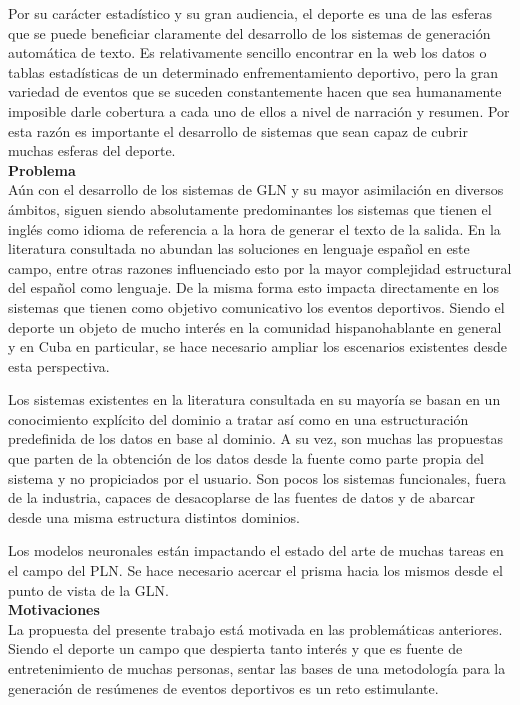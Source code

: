     Por su carácter estadístico y su gran audiencia, el deporte es una de las esferas que se puede beneficiar claramente del desarrollo de los sistemas 
de generación automática de texto. Es relativamente sencillo encontrar en la web los datos o tablas estadísticas de un determinado enfrementamiento deportivo, 
pero la gran variedad de eventos que se suceden constantemente hacen que sea humanamente imposible darle cobertura a cada uno de ellos a nivel de narración y 
resumen. Por esta razón es importante el desarrollo de sistemas que sean capaz de cubrir muchas esferas del deporte.\\


   \textbf{Problema}\\

    Aún con el desarrollo de los sistemas de GLN y su mayor asimilación en diversos ámbitos, siguen siendo absolutamente predominantes los 
sistemas que tienen el inglés como idioma de referencia a la hora de generar el texto de la salida. En la literatura consultada no abundan las soluciones 
en lenguaje español en este campo, entre otras razones influenciado esto por la mayor complejidad estructural del español como lenguaje. De la misma forma esto 
impacta directamente en los sistemas que tienen como objetivo comunicativo los eventos deportivos. Siendo el deporte un objeto de mucho interés en la 
comunidad hispanohablante en general y en Cuba en particular, se hace necesario ampliar los escenarios existentes desde esta perspectiva.

    Los sistemas existentes en la literatura consultada en su mayoría se basan en un conocimiento explícito del dominio a tratar así como en una 
estructuración predefinida de los datos en base al dominio. A su vez, son muchas las propuestas que parten de la obtención de los datos desde 
la fuente como parte propia del sistema y no propiciados por el usuario. Son pocos los sistemas funcionales, fuera de la industria, capaces de 
desacoplarse de las fuentes de datos y de abarcar desde una misma estructura distintos dominios.

    Los modelos neuronales están impactando el estado del arte de muchas tareas en el campo del PLN. Se hace necesario 
acercar el prisma hacia los mismos desde el punto de vista de la GLN.\\

    \textbf{Motivaciones}\\

    La propuesta del presente trabajo está motivada en las problemáticas anteriores. Siendo el deporte un campo que despierta tanto 
interés y que es fuente de entretenimiento de muchas personas, sentar las bases de una metodología para la generación de resúmenes de 
eventos deportivos es un reto estimulante.

